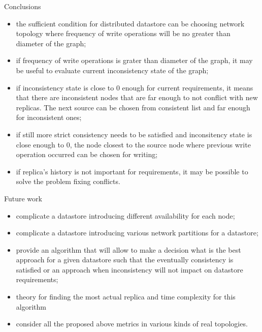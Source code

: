 \documentclass[aspectratio=43]{beamer}
\begin{document}
\begin{frame}{Conclusions}

\begin{itemize}
\item the sufficient condition for distributed datastore can be choosing network topology where frequency of write operations will be no greater than diameter of the graph;
\item if frequency of write operations is grater than diameter of the graph, it may be useful to evaluate current inconsistency state of the graph;
\item if inconsistency state is close to 0 enough for current requirements, it means that there are inconsistent nodes that are far enough to not conflict with new replicas. The next source can be chosen from consistent list and far enough for inconsistent ones;
\item if still more strict consistency needs to be satisfied and inconsitency state is close enough to 0, the node closest to the source node where previous write operation occurred can be chosen for writing;
\item if replica's history is not important for requirements, it may be possible to solve the problem fixing conflicts.
\end{itemize}

\end{frame}

\begin{frame}{Future work}
\begin{itemize}
\item complicate a datastore introducing different availability for each node;
\item complicate a datastore introducing various network partitions for a datastore;
\item provide an algorithm that will allow to make a decision what is the best approach for a given datastore such that the eventually consistency is satisfied or an approach when inconsistency will not impact on datastore requirements;
\item theory for finding the most actual replica and time complexity for this algorithm
\item consider all the proposed above metrics in various kinds of real topologies.
\end{itemize}

\end{frame}
\end{document}
